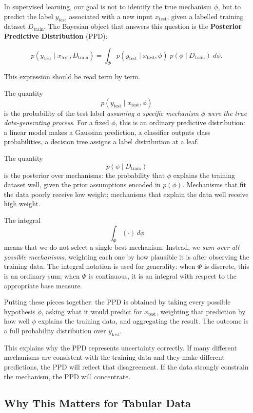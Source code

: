 \documentclass[12pt]{article}
\begin{document}
In supervised learning, our goal is not to identify the true mechanism $\phi$, but to predict the label $y_{\text{test}}$ associated with a new input $x_{\text{test}}$, given a labelled training dataset $D_{\text{train}}$. The Bayesian object that answers this question is the \textbf{Posterior Predictive Distribution} (PPD):

\[
p(y_{\text{test}} \mid x_{\text{test}}, D_{\text{train}})
=
\int_\Phi
p(y_{\text{test}} \mid x_{\text{test}}, \phi)
\;
p(\phi \mid D_{\text{train}})
\;
d\phi.
\]

This expression should be read term by term.

The quantity
\[
p(y_{\text{test}} \mid x_{\text{test}}, \phi)
\]
is the probability of the test label \emph{assuming a specific mechanism $\phi$ were the true data-generating process}. For a fixed $\phi$, this is an ordinary predictive distribution: a linear model makes a Gaussian prediction, a classifier outputs class probabilities, a decision tree assigns a label distribution at a leaf.

The quantity
\[
p(\phi \mid D_{\text{train}})
\]
is the posterior over mechanisms: the probability that $\phi$ explains the training dataset well, given the prior assumptions encoded in $p(\phi)$. Mechanisms that fit the data poorly receive low weight; mechanisms that explain the data well receive high weight.

The integral
\[
\int_\Phi (\cdot)\, d\phi
\]
means that we do not select a single best mechanism. Instead, we \emph{sum over all possible mechanisms}, weighting each one by how plausible it is after observing the training data. The integral notation is used for generality: when $\Phi$ is discrete, this is an ordinary sum; when $\Phi$ is continuous, it is an integral with respect to the appropriate base measure.

Putting these pieces together: the PPD is obtained by taking every possible hypothesis $\phi$, asking what it would predict for $x_{\text{test}}$, weighting that prediction by how well $\phi$ explains the training data, and aggregating the result. The outcome is a full probability distribution over $y_{\text{test}}$.

This explains why the PPD represents uncertainty correctly. If many different mechanisms are consistent with the training data and they make different predictions, the PPD will reflect that disagreement. If the data strongly constrain the mechanism, the PPD will concentrate.

\subsection{Why This Matters for Tabular Data}
\end{document}
